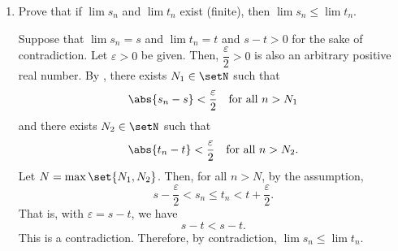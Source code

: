 \begin{enumerate}
\begin{enumerate}
\begin{subprove}
        \[
          t_n < M \quad\text{for all } n > N_1.
        \]
        Let \(N = \max\set{N_0, N_1}\). Then, for all \(n > N\), by the assumption,
        \[
          s_n \le t_n < M.
        \]
        Therefore, by definition, \(\lim s_n = -\infty\).
      \end{subprove}
      \item Prove that if \(\lim s_n\) and \(\lim t_n\) exist (finite), then \(\lim s_n\le \lim t_n\).
      \begin{subprove}
        Suppose that \(\lim s_n = s\) and \(\lim t_n = t\) and \(s - t > 0\) for the sake of contradiction.
        Let \(\varepsilon > 0\) be given. Then, \(\dfrac{\varepsilon}{2} > 0\) is also an arbitrary positive real number.
        By , there exists \(N_1 \in \setN\) such that
        \[
          \abs{s_n - s} < \dfrac{\varepsilon}{2} \quad\text{for all } n > N_1
        \]
        and there exists \(N_2 \in \setN\) such that
        \[
          \abs{t_n - t} < \dfrac{\varepsilon}{2} \quad\text{for all } n > N_2.
        \]
        Let \(N = \max\set{N_1, N_2}\). Then, for all \(n > N\), by the assumption,
        \[
          s - \dfrac{\varepsilon}{2} < s_n \le t_n < t + \dfrac{\varepsilon}{2}.
        \]
        That is, with \(\varepsilon = s - t\), we have
        \[
          s - t < s - t.
        \]
        This is a contradiction. Therefore, by contradiction, \(\lim s_n\le \lim t_n\).
      \end{subprove}
    \end{enumerate}
\end{enumerate}



























